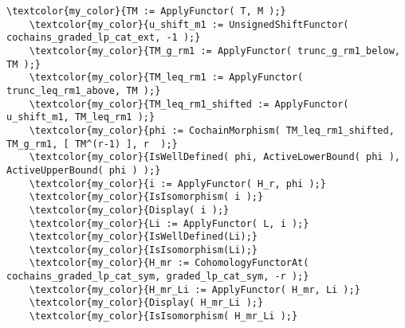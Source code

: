 \documentclass[16pt,a4paper]{extarticle}
\theoremstyle{definition}
\theoremstyle{theorem}
\begin{document}
    \begin{Verbatim}[commandchars=\\\{\}, fontseries=b, frame=single, label=Gap Code, framerule=0.5mm, rulecolor=\color{rule_color} ]
    \textcolor{my_color}{TM := ApplyFunctor( T, M );}
    \textcolor{my_color}{u_shift_m1 := UnsignedShiftFunctor( cochains_graded_lp_cat_ext, -1 );}
    \textcolor{my_color}{TM_g_rm1 := ApplyFunctor( trunc_g_rm1_below, TM );}
    \textcolor{my_color}{TM_leq_rm1 := ApplyFunctor( trunc_leq_rm1_above, TM );}
    \textcolor{my_color}{TM_leq_rm1_shifted := ApplyFunctor( u_shift_m1, TM_leq_rm1 );}
    \textcolor{my_color}{phi := CochainMorphism( TM_leq_rm1_shifted, TM_g_rm1, [ TM^(r-1) ], r  );}
    \textcolor{my_color}{IsWellDefined( phi, ActiveLowerBound( phi ), ActiveUpperBound( phi ) );}
    \textcolor{my_color}{i := ApplyFunctor( H_r, phi );}
    \textcolor{my_color}{IsIsomorphism( i );}
    \textcolor{my_color}{Display( i );}
    \textcolor{my_color}{Li := ApplyFunctor( L, i );}
    \textcolor{my_color}{IsWellDefined(Li);}
    \textcolor{my_color}{IsIsomorphism(Li);}
    \textcolor{my_color}{H_mr := CohomologyFunctorAt( cochains_graded_lp_cat_sym, graded_lp_cat_sym, -r );}
    \textcolor{my_color}{H_mr_Li := ApplyFunctor( H_mr, Li );}
    \textcolor{my_color}{Display( H_mr_Li );}
    \textcolor{my_color}{IsIsomorphism( H_mr_Li );}
    \end{Verbatim}
    
\end{document}
